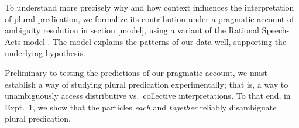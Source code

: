 \documentclass[linguex]{sp}
\begin{document}
To understand more precisely why and how context  influences the interpretation of plural predication, we formalize its contribution under a pragmatic account of ambiguity resolution in section \ref{model}, using a variant of the Rational Speech-Acts model \citep[e.g.,][]{frankgoodman2012,lassitergoodman2013}. The model explains the patterns of our data well, supporting the underlying hypothesis.

Preliminary to testing the predictions of our pragmatic account, we must establish a way of studying plural predication experimentally; that is, a way to unambiguously access distributive vs.~collective interpretations. To that end, in Expt.~1, we show that the particles \emph{each} and \emph{together} reliably disambiguate plural predication. 










\end{document}
